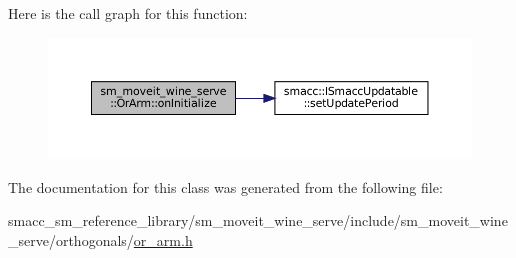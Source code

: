 Here is the call graph for this function\+:
\nopagebreak
\begin{figure}[H]
\begin{center}
\leavevmode
\includegraphics[width=350pt]{classsm__moveit__wine__serve_1_1OrArm_a859764a8929a4a8fbfdfbba4af8bdbee_cgraph}
\end{center}
\end{figure}


The documentation for this class was generated from the following file\+:\begin{DoxyCompactItemize}
\item 
smacc\+\_\+sm\+\_\+reference\+\_\+library/sm\+\_\+moveit\+\_\+wine\+\_\+serve/include/sm\+\_\+moveit\+\_\+wine\+\_\+serve/orthogonals/\hyperlink{sm__moveit__wine__serve_2include_2sm__moveit__wine__serve_2orthogonals_2or__arm_8h}{or\+\_\+arm.\+h}\end{DoxyCompactItemize}
